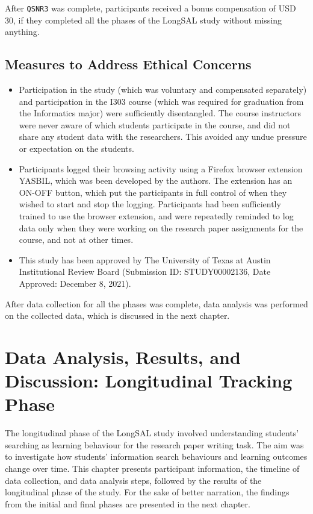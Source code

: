 \documentclass[letterpaper, nobind]{templates/ociamthesis}
\begin{document}
After \texttt{QSNR3} was complete, participants received a bonus compensation of USD 30, if they completed all the phases of the LongSAL study without missing anything.

\hypertarget{measures-to-address-ethical-concerns}{%
\section{Measures to Address Ethical Concerns}\label{measures-to-address-ethical-concerns}}

\begin{itemize}
\item
  Participation in the study (which was voluntary and compensated separately) and participation in the I303 course (which was required for graduation from the Informatics major) were sufficiently disentangled. The course instructors were never aware of which students participate in the course, and did not share any student data with the researchers. This avoided any undue pressure or expectation on the students.
\item
  Participants logged their browsing activity using a Firefox browser extension YASBIL, which was been developed by the authors. The extension has an ON-OFF button, which put the participants in full control of when they wished to start and stop the logging. Participants had been sufficiently trained to use the browser extension, and were repeatedly reminded to log data only when they were working on the research paper assignments for the course, and not at other times.
\item
  This study has been approved by The University of Texas at Austin Institutional Review Board (Submission ID: STUDY00002136, Date Approved: December 8, 2021).
\end{itemize}

After data collection for all the phases was complete, data analysis was performed on the collected data, which is discussed in the next chapter.

\hypertarget{data-analysis-results-and-discussion-longitudinal-tracking-phase}{%
\chapter{Data Analysis, Results, and Discussion: Longitudinal Tracking Phase}\label{data-analysis-results-and-discussion-longitudinal-tracking-phase}}

The longitudinal phase of the LongSAL study involved understanding students' searching as learning behaviour for the research paper writing task.
The aim was to investigate how students' information search behaviours and learning outcomes change over time.
This chapter presents participant information, the timeline of data collection, and data analysis steps, followed by the results of the longitudinal phase of the study.
For the sake of better narration, the findings from the initial and final phases are presented in the next chapter.
\end{document}
